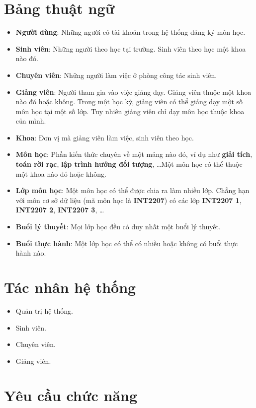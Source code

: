 \documentclass[12pt]{book}
\begin{document}
  \section{Bảng thuật ngữ}
    \begin{itemize}
      \item \textbf{Người dùng}: Những người có tài khoản trong hệ thống đăng ký môn học.
      \item \textbf{Sinh viên}: Những người theo học tại trường. Sinh viên theo học một khoa nào đó.
      \item \textbf{Chuyên viên}: Những người làm việc ở phòng công tác sinh viên.
      \item \textbf{Giảng viên}: Người tham gia vào việc giảng dạy. Giảng viên thuộc một khoa nào đó hoặc không. Trong một học kỳ, giảng viên có thể giảng dạy một số môn học tại một số lớp. Tuy nhiên giảng viên chỉ dạy môn học thuộc khoa của mình.
      \item \textbf{Khoa}: Đơn vị mà giảng viên làm việc, sinh viên theo học.
      \item \textbf{Môn học}: Phần kiến thức chuyên về một mảng nào đó, ví dụ như \textbf{giải tích}, \textbf{toán rời rạc}, \textbf{lập trình hướng đối tượng}, \ldots Một môn học có thể thuộc một khoa nào đó hoặc không.
      \item \textbf{Lớp môn học}: Một môn học có thể được chia ra làm nhiều lớp. Chẳng hạn với môn cơ sở dữ liệu (mã môn học là \textbf{INT2207}) có các lớp \textbf{INT2207 1}, \textbf{INT2207 2}, \textbf{INT2207 3}, \ldots
      \item \textbf{Buổi lý thuyết}: Mọi lớp học đều có duy nhất một buổi lý thuyết.
      \item \textbf{Buổi thực hành}: Một lớp học có thể có nhiều hoặc không có buổi thực hành nào.
    \end{itemize}
  
  \section{Tác nhân hệ thống}
    \begin{itemize}
      \item Quản trị hệ thống.
      \item Sinh viên.
      \item Chuyên viên.
      \item Giảng viên.
    \end{itemize}
  
  \section{Yêu cầu chức năng}
\end{document}
